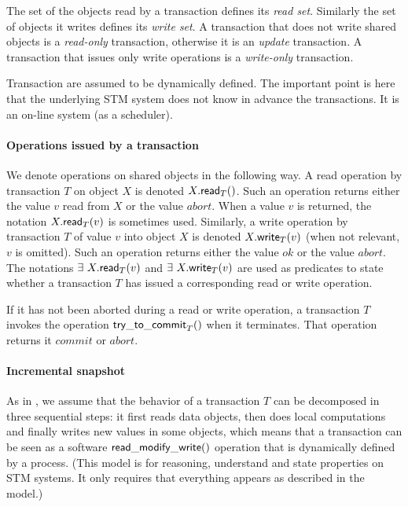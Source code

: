 The set of the objects read by a transaction  defines its
{\it read  set}.  Similarly the set  of objects it writes  defines its 
{\it write set}. A transaction that does not  write shared objects is 
a  {\it  read-only}  transaction, otherwise it is an {\it update}
transaction.  A transaction that issues only write operations is 
a {\it write-only}  transaction. 

Transaction are assumed to be dynamically defined. The important point is here 
that the  underlying STM system does not know in advance the transactions. 
It is an  on-line system (as a scheduler).  



\paragraph{Operations issued by a transaction}
We denote operations on shared objects in the following way.
A read operation by transaction $T$ on object $X$ is denoted
$X.{\sf read}_T()$. Such an operation returns either the value $v$ read from 
$X$ or the value $abort$.  When a value $v$ is returned, 
the notation  $X.{\sf read}_T(v)$ is sometimes used.  
%
Similarly, a write operation by transaction $T$ of value $v$ into object 
$X$ is denoted $X.{\sf write}_T(v)$ (when not relevant, $v$ is omitted). 
Such an operation returns either the value $ok$ or the value $abort$. 
%
The notations $\exists~ X.{\sf read}_T(v)$  and $\exists~ X.{\sf write}_T(v)$ 
are  used as  predicates to  state whether a transaction  $T$ has issued a
corresponding read or write operation. 


If  it  has  not  been  aborted  during a  read  or  write  operation,    a
transaction $T$ invokes  the operation ${\sf try\_to\_commit}_T()$ when 
it terminates. That operation returns it $commit$ or $abort$. 



\paragraph{Incremental snapshot}
As  in \cite{BSW79},  we assume  that the behavior of a transaction $T$  
can be decomposed in  three sequential steps:  
it first reads  data objects,  then does local computations and 
finally   writes  new values  in some  objects, which means
that  a  transaction can  be  seen as  a software 
${\sf read\_modify\_write()}$ operation that is 
dynamically defined  by  a process. (This model is for 
reasoning, understand and  state properties on STM systems.  
It only requires that everything appears as described  in the model.)


